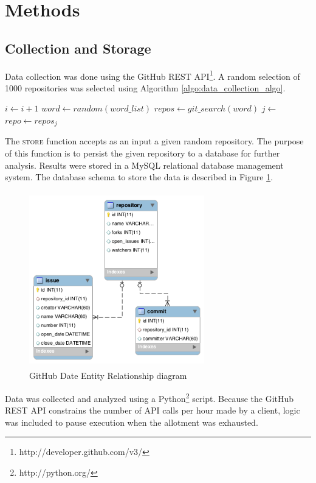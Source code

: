 \documentclass{proc}
\begin{document}
\section{Methods}
\subsection{Collection and Storage}
Data collection was done using the GitHub REST API\footnote{http://developer.github.com/v3/}. A random selection of 1000 repositories was selected using Algorithm \ref{algo:data_collection_algo}.

\begin{algorithm}[H]
\label{algo:data_collection_algo}
\begin{algorithmic}[1]
\State $i \gets i + 1$
\State $word \gets random(word\_list)$
\State $repos \gets git\_search(word)$
\State $j \gets $%
\State $repo \gets repos_j$
\State {}
\EndWhile
\end{algorithmic}
\end{algorithm}

The \textsc{store} function accepts as an input a given random repository. The purpose of this function is to persist the given repository to a database for further analysis. Results were stored in a MySQL relational database management system. The database schema to store the data is described in Figure \ref{fig:er_diagram}.

\begin{figure}
\includegraphics[height=3in,width=3in]{images/er.png}
\caption{GitHub Date Entity Relationship diagram}
\label{fig:er_diagram}
\end{figure}

Data was collected and analyzed using a Python\footnote{http://python.org/} script. Because the GitHub REST API constrains the number of API calls per hour made by a client, logic was included to pause execution when the allotment was exhausted.
\end{document}
